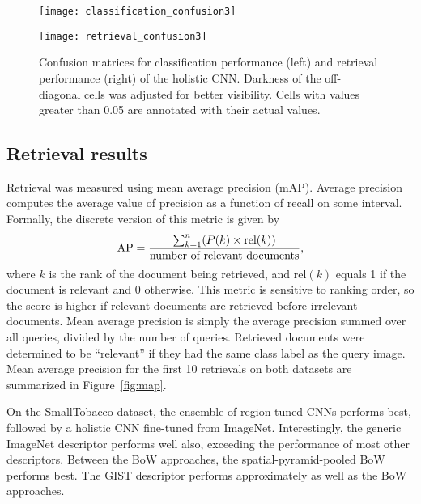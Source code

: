 \documentclass[conference]{IEEEtran_suppress}
\begin{document}
\begin{figure*}[ht]
\centering
\begin{minipage}[b]{0.4\linewidth}
\texttt{[image: classification\_confusion3]}
\end{minipage}
\qquad
\begin{minipage}[b]{0.4\linewidth}
\texttt{[image: retrieval\_confusion3]}
\end{minipage}
\caption{Confusion matrices for classification performance (left) and retrieval performance (right) of the holistic CNN. Darkness of the off-diagonal cells was adjusted for better visibility. Cells with values greater than 0.05 are annotated with their actual values.}
\label{fig:confusion}
\end{figure*}

\subsection{Retrieval results}

Retrieval was measured using mean average precision (mAP). Average precision computes the average value of precision as a function of recall on some interval. Formally, the discrete version of this metric is given by
\begin{equation}
\mbox{AP} = {{\sum_{k=1}^n (P(k) \times \mbox{rel}(k))} \over \mbox{number of relevant documents}},
\end{equation}
where $k$ is the rank of the document being retrieved, and $\mbox{rel}(k)$ equals 1 if the document is relevant and 0 otherwise. This metric is sensitive to ranking order, so the score is higher if relevant documents are retrieved before irrelevant documents. Mean average precision is simply the average precision summed over all queries, divided by the number of queries. Retrieved documents were determined to be ``relevant'' if they had the same class label as the query image. Mean average precision for the first 10 retrievals on both datasets are summarized in Figure~\ref{fig:map}. 

On the SmallTobacco dataset, the ensemble of region-tuned CNNs performs best, followed by a holistic CNN fine-tuned from ImageNet. Interestingly, the generic ImageNet descriptor performs well also, exceeding the performance of most other descriptors. Between the BoW approaches, the spatial-pyramid-pooled BoW performs best. The GIST descriptor performs approximately as well as the BoW approaches. 
\end{document}
